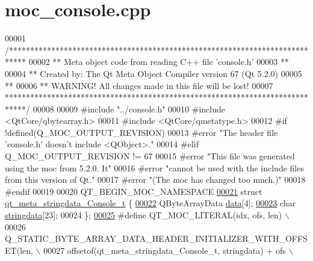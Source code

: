 \hypertarget{a00013_source}{\section{moc\+\_\+console.\+cpp}
\label{a00013_source}
}

\begin{DoxyCode}
00001 \textcolor{comment}{/****************************************************************************}
00002 \textcolor{comment}{** Meta object code from reading C++ file 'console.h'}
00003 \textcolor{comment}{**}
00004 \textcolor{comment}{** Created by: The Qt Meta Object Compiler version 67 (Qt 5.2.0)}
00005 \textcolor{comment}{**}
00006 \textcolor{comment}{** WARNING! All changes made in this file will be lost!}
00007 \textcolor{comment}{*****************************************************************************/}
00008 
00009 \textcolor{preprocessor}{#include "../console.h"}
00010 \textcolor{preprocessor}{#include <QtCore/qbytearray.h>}
00011 \textcolor{preprocessor}{#include <QtCore/qmetatype.h>}
00012 \textcolor{preprocessor}{#if !defined(Q\_MOC\_OUTPUT\_REVISION)}
00013 \textcolor{preprocessor}{#error "The header file 'console.h' doesn't include <QObject>."}
00014 \textcolor{preprocessor}{#elif Q\_MOC\_OUTPUT\_REVISION != 67}
00015 \textcolor{preprocessor}{#error "This file was generated using the moc from 5.2.0. It"}
00016 \textcolor{preprocessor}{#error "cannot be used with the include files from this version of Qt."}
00017 \textcolor{preprocessor}{#error "(The moc has changed too much.)"}
00018 \textcolor{preprocessor}{#endif}
00019 
00020 QT\_BEGIN\_MOC\_NAMESPACE
\hypertarget{a00013_source_l00021}{}\hyperlink{a00013}{00021} \textcolor{keyword}{struct }\hyperlink{a00013_dc/d54/a00094}{qt\_meta\_stringdata\_Console\_t} \{
\hypertarget{a00013_source_l00022}{}\hyperlink{a00013_af7131d57b034ad13a178d273cfee74c2}{00022}     QByteArrayData \hyperlink{a00013_af7131d57b034ad13a178d273cfee74c2}{data}[4];
\hypertarget{a00013_source_l00023}{}\hyperlink{a00013_a63ab346e732e08dad62cdef78b05d53d}{00023}     \textcolor{keywordtype}{char} \hyperlink{a00013_a63ab346e732e08dad62cdef78b05d53d}{stringdata}[23];
00024 \};
\hypertarget{a00013_source_l00025}{}\hyperlink{a00013_a75bb9482d242cde0a06c9dbdc6b83abe}{00025} \textcolor{preprocessor}{#define QT\_MOC\_LITERAL(idx, ofs, len) \(\backslash\)}
00026 \textcolor{preprocessor}{    Q\_STATIC\_BYTE\_ARRAY\_DATA\_HEADER\_INITIALIZER\_WITH\_OFFSET(len, \(\backslash\)}
00027 \textcolor{preprocessor}{    offsetof(qt\_meta\_stringdata\_Console\_t, stringdata) + ofs \(\backslash\)}

\end{DoxyCode}
